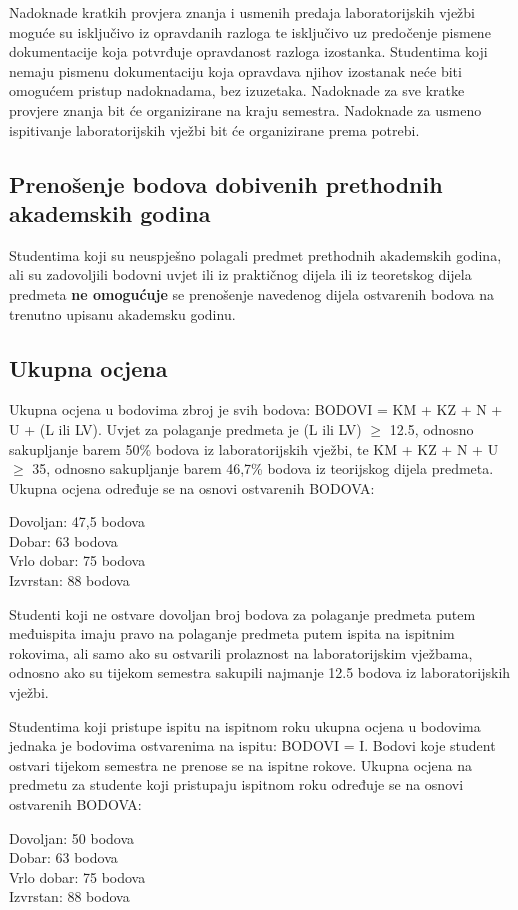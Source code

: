 \documentclass[times, 12pt, utf8]{book}
\newenvironment{myindentpar}[1]%
{\begin{list}{}%
         {\setlength{\leftmargin}{#1}}%
         \item[]%
}
{\end{list}}
\begin{document}
Nadoknade kratkih provjera znanja i usmenih predaja laboratorijskih vježbi moguće su isključivo iz opravdanih razloga te isključivo uz predočenje pismene dokumentacije koja potvrđuje opravdanost razloga izostanka.
Studentima koji nemaju pismenu dokumentaciju koja opravdava njihov izostanak neće biti omogućem pristup nadoknadama, bez izuzetaka.
Nadoknade za sve kratke provjere znanja bit će organizirane na kraju semestra.
Nadoknade za usmeno ispitivanje laboratorijskih vježbi bit će organizirane prema potrebi.

\cleardoublepage  
{}  
{}
\subsection*{Prenošenje bodova dobivenih prethodnih akademskih godina}

Studentima koji su neuspješno polagali predmet prethodnih akademskih godina, ali su zadovoljili bodovni uvjet ili iz praktičnog dijela ili iz teoretskog dijela predmeta \textbf{ne omogućuje} se prenošenje navedenog dijela ostvarenih bodova na trenutno upisanu akademsku godinu.

\cleardoublepage  
{}  
{}
\subsection*{Ukupna ocjena}

Ukupna ocjena u bodovima zbroj je svih bodova: BODOVI = KM + KZ + N + U + (L ili LV).
Uvjet za polaganje predmeta je (L ili LV) $\geq$ 12.5, odnosno sakupljanje barem 50\% bodova iz laboratorijskih vježbi, te KM + KZ + N + U $\geq$ 35, odnosno sakupljanje barem 46,7\% bodova iz teorijskog dijela predmeta. \\
Ukupna ocjena određuje se na osnovi ostvarenih BODOVA:
\begin{myindentpar}{30pt}
Dovoljan: 47,5 bodova \\
Dobar: 63 bodova \\
Vrlo dobar: 75 bodova \\
Izvrstan: 88 bodova 
\end{myindentpar}

Studenti koji ne ostvare dovoljan broj bodova za polaganje predmeta putem međuispita imaju pravo na polaganje predmeta putem ispita na ispitnim rokovima, ali samo ako su ostvarili prolaznost na laboratorijskim vježbama, odnosno ako su tijekom semestra sakupili najmanje 12.5 bodova iz laboratorijskih vježbi.

Studentima koji pristupe ispitu na ispitnom roku ukupna ocjena u bodovima jednaka je bodovima ostvarenima na ispitu: BODOVI = I.
Bodovi koje student ostvari tijekom semestra ne prenose se na ispitne rokove.
Ukupna ocjena na predmetu za studente koji pristupaju ispitnom roku određuje se na osnovi ostvarenih BODOVA:
\begin{myindentpar}{30pt}
Dovoljan: 50 bodova \\
Dobar: 63 bodova \\
Vrlo dobar: 75 bodova \\
Izvrstan: 88 bodova 
\end{myindentpar}
\end{document}
